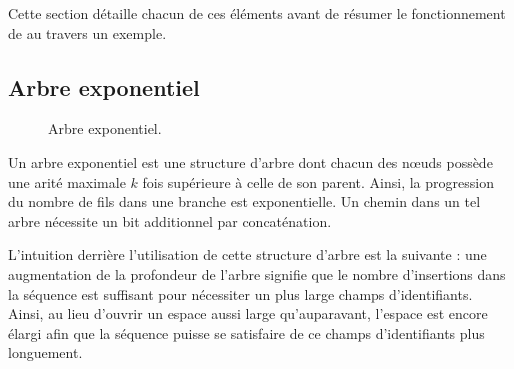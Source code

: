 
Cette section détaille chacun de ces éléments avant de résumer le fonctionnement
de \LSEQ au travers un exemple.







\subsection{Arbre exponentiel}
\label{repl:subsec:exponentialtree}

\begin{figure}
  \begin{center}
    
    \caption[Arbre exponentiel]
    {\label{repl:fig:exponentialtree}Arbre exponentiel.}
  \end{center}
\end{figure}


Un arbre exponentiel est une structure d'arbre dont chacun des nœuds possède une
arité maximale $k$ fois supérieure à celle de son parent. Ainsi, la progression
du nombre de fils dans une branche est exponentielle. Un chemin dans un tel
arbre nécessite un bit additionnel par concaténation.

L'intuition derrière l'utilisation de cette structure d'arbre est la suivante :
une augmentation de la profondeur de l'arbre signifie que le nombre d'insertions
dans la séquence est suffisant pour nécessiter un plus large champs
d'identifiants. Ainsi, au lieu d'ouvrir un espace aussi large qu'auparavant,
l'espace est encore élargi afin que la séquence puisse se satisfaire de ce champs
d'identifiants plus longuement.


